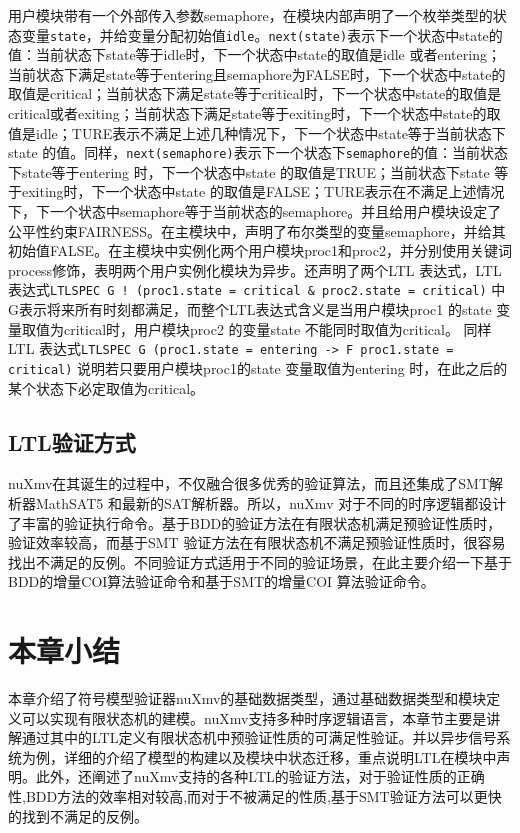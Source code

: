 用户模块带有一个外部传入参数semaphore，在模块内部声明了一个枚举类型的状态变量\verb|state|，并给变量分配初始值\verb|idle|。\verb|next(state)|表示下一个状态中state的值：当前状态下state等于idle时，下一个状态中state的取值是idle 或者entering；当前状态下满足state等于entering且semaphore为FALSE时，下一个状态中state的取值是critical；当前状态下满足state等于critical时，下一个状态中state的取值是critical或者exiting；当前状态下满足state等于exiting时，下一个状态中state的取值是idle；TURE表示不满足上述几种情况下，下一个状态中state等于当前状态下state 的值。同样，\verb|next(semaphore)|表示下一个状态下\verb|semaphore|的值：当前状态下state等于entering 时，下一个状态中state 的取值是TRUE；当前状态下state 等于exiting时，下一个状态中state 的取值是FALSE；TURE表示在不满足上述情况下，下一个状态中semaphore等于当前状态的semaphore。并且给用户模块设定了公平性约束FAIRNESS。在主模块中，声明了布尔类型的变量semaphore，并给其初始值FALSE。在主模块中实例化两个用户模块proc1和proc2，并分别使用关键词process修饰，表明两个用户实例化模块为异步。还声明了两个LTL 表达式，LTL表达式\verb|LTLSPEC G ! (proc1.state = critical & proc2.state = critical)| 中G表示将来所有时刻都满足，而整个LTL表达式含义是当用户模块proc1 的state 变量取值为critical时，用户模块proc2 的变量state 不能同时取值为critical。 同样LTL 表达式\verb|LTLSPEC G (proc1.state = entering -> F proc1.state = critical)| 说明若只要用户模块proc1的state 变量取值为entering 时，在此之后的某个状态下必定取值为critical。

\subsection{LTL验证方式}
nuXmv在其诞生的过程中，不仅融合很多优秀的验证算法，而且还集成了SMT解析器MathSAT5 和最新的SAT解析器。所以，nuXmv 对于不同的时序逻辑都设计了丰富的验证执行命令。基于BDD的验证方法在有限状态机满足预验证性质时，验证效率较高，而基于SMT 验证方法在有限状态机不满足预验证性质时，很容易找出不满足的反例。不同验证方式适用于不同的验证场景，在此主要介绍一下基于BDD的增量COI算法验证命令和基于SMT的增量COI 算法验证命令。

\section{本章小结}
本章介绍了符号模型验证器nuXmv的基础数据类型，通过基础数据类型和模块定义可以实现有限状态机的建模。nuXmv支持多种时序逻辑语言，本章节主要是讲解通过其中的LTL定义有限状态机中预验证性质的可满足性验证。并以异步信号系统为例，详细的介绍了模型的构建以及模块中状态迁移，重点说明LTL在模块中声明。此外，还阐述了nuXmv支持的各种LTL的验证方法，对于验证性质的正确性,BDD方法的效率相对较高,而对于不被满足的性质,基于SMT验证方法可以更快的找到不满足的反例。
